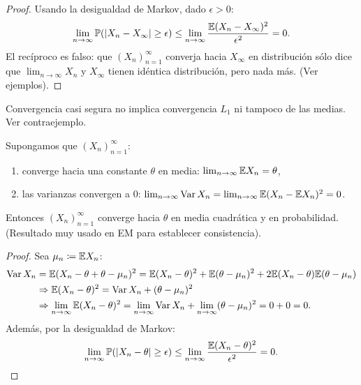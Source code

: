 \begin{proof}
Usando la desigualdad de Markov, dado $\epsilon > 0$:
\[
  \lim_{n\to\infty} \mathbb{P}(|X_n - X_\infty| \ge \epsilon) \le \lim_{n\to\infty} \frac{\mathbb{E}(X_n - X_\infty)^2}{\epsilon^2} = 0.
\]
El recíproco es falso: que $(X_n)_{n=1}^\infty$ converja hacia $X_\infty$ en distribución sólo dice que $\lim_{n\to\infty} X_n$ y $X_\infty$ tienen idéntica distribución, pero nada más. (Ver ejemplos).
\end{proof}

\begin{observacion}[8]
Convergencia casi segura no implica convergencia $L_1$ ni tampoco de las medias. Ver contraejemplo.
\end{observacion}

\begin{proposicion}[22]
Supongamos que $(X_n)_{n=1}^\infty$:
\begin{enumerate}
  \item converge hacia una constante $\theta$ en media: $\lim_{n\to\infty} \mathbb{E} X_n = \theta$,
  \item las varianzas convergen a $0$: $\lim_{n\to\infty} \operatorname{Var} X_n = \lim_{n\to\infty} \mathbb{E}(X_n - \mathbb{E} X_n)^2 = 0$.
\end{enumerate}
Entonces $(X_n)_{n=1}^\infty$ converge hacia $\theta$ en media cuadrática y en probabilidad. (Resultado muy usado en EM para establecer consistencia).
\end{proposicion}

\begin{proof}
Sea $\mu_n \coloneqq \mathbb{E} X_n$:
\begin{align*}
  \operatorname{Var} X_n &= \mathbb{E}(X_n - \theta + \theta - \mu_n)^2 = \mathbb{E}(X_n - \theta)^2 + \mathbb{E}(\theta - \mu_n)^2 + 2\mathbb{E}(X_n - \theta)\mathbb{E}(\theta - \mu_n) \\
           &\Rightarrow \mathbb{E}(X_n - \theta)^2 = \operatorname{Var} X_n + (\theta - \mu_n)^2 \\
           &\Rightarrow \lim_{n\to\infty} \mathbb{E}(X_n - \theta)^2 = \lim_{n\to\infty} \operatorname{Var} X_n + \lim_{n\to\infty} (\theta - \mu_n)^2 = 0 + 0 = 0.
\end{align*}
Además, por la desigualdad de Markov:
\[
  \lim_{n\to\infty} \mathbb{P}(|X_n - \theta| \ge \epsilon) \le \lim_{n\to\infty} \frac{\mathbb{E}(X_n - \theta)^2}{\epsilon^2} = 0.
\]
\end{proof}

